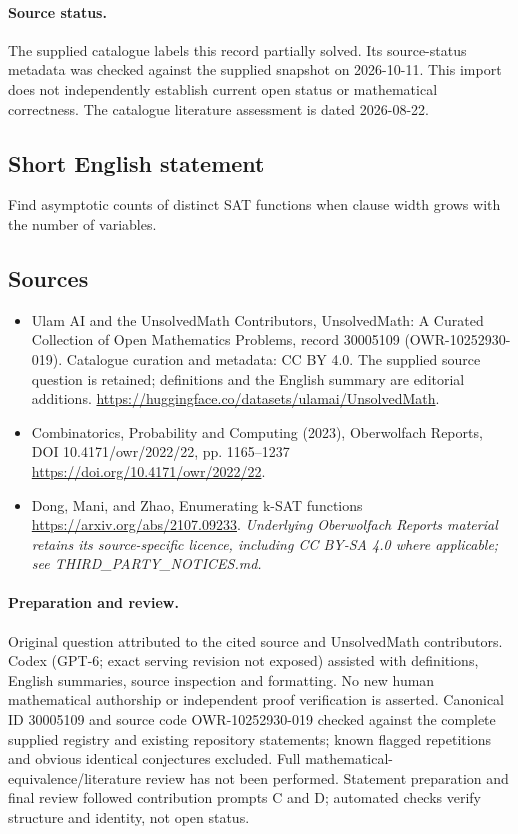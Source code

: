 \documentclass[11pt]{article}
\begin{document}
\paragraph{Source status.}
The supplied catalogue labels this record partially solved. Its source-status metadata was checked against the supplied snapshot on 2026-10-11. This import does not independently establish current open status or mathematical correctness. The catalogue literature assessment is dated 2026-08-22.
\subsection{Short English statement}
Find asymptotic counts of distinct SAT functions when clause width grows with the number of variables.
\subsection{Sources}
\begin{itemize}
\item[S1] Ulam AI and the UnsolvedMath Contributors, UnsolvedMath: A Curated Collection of Open Mathematics Problems, record 30005109 (OWR-10252930-019). Catalogue curation and metadata: CC BY 4.0. The supplied source question is retained; definitions and the English summary are editorial additions.
\url{https://huggingface.co/datasets/ulamai/UnsolvedMath}.
\item[S2] Combinatorics, Probability and Computing (2023), Oberwolfach Reports, DOI 10.4171/owr/2022/22, pp. 1165--1237
\url{https://doi.org/10.4171/owr/2022/22}.
\item[S3] Dong, Mani, and Zhao, Enumerating k-SAT functions
\url{https://arxiv.org/abs/2107.09233}.
\textit{Underlying Oberwolfach Reports material retains its source-specific licence, including CC BY-SA 4.0 where applicable; see THIRD\_PARTY\_NOTICES.md.}
\end{itemize}
\paragraph{Preparation and review.}
Original question attributed to the cited source and UnsolvedMath contributors. Codex (GPT-6; exact serving revision not exposed) assisted with definitions, English summaries, source inspection and formatting. No new human mathematical authorship or independent proof verification is asserted. Canonical ID 30005109 and source code OWR-10252930-019 checked against the complete supplied registry and existing repository statements; known flagged repetitions and obvious identical conjectures excluded. Full mathematical-equivalence/literature review has not been performed. Statement preparation and final review followed contribution prompts C and D; automated checks verify structure and identity, not open status.
\label{end:30005109}
\end{document}
